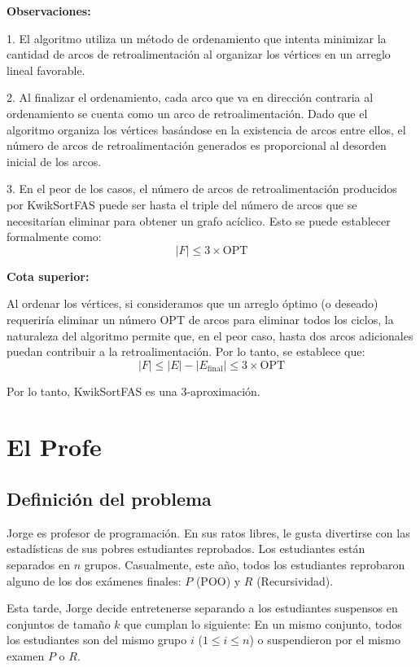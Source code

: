 \documentclass{article}
\begin{document}
\textbf{Observaciones:}

1. El algoritmo utiliza un método de ordenamiento que intenta minimizar la cantidad de arcos de retroalimentación al organizar los vértices en un arreglo lineal favorable.
  
2. Al finalizar el ordenamiento, cada arco que va en dirección contraria al ordenamiento se cuenta como un arco de retroalimentación. Dado que el algoritmo organiza los vértices basándose en la existencia de arcos entre ellos, el número de arcos de retroalimentación generados es proporcional al desorden inicial de los arcos.

3. En el peor de los casos, el número de arcos de retroalimentación producidos por KwikSortFAS puede ser hasta el triple del número de arcos que se necesitarían eliminar para obtener un grafo acíclico. Esto se puede establecer formalmente como:
   \[
   |F| \leq 3 \times \text{OPT}
   \]

\textbf{Cota superior:}

Al ordenar los vértices, si consideramos que un arreglo óptimo (o deseado) requeriría eliminar un número \(\text{OPT}\) de arcos para eliminar todos los ciclos, la naturaleza del algoritmo permite que, en el peor caso, hasta dos arcos adicionales puedan contribuir a la retroalimentación. Por lo tanto, se establece que:
\[
|F| \leq |E| - |E_{\text{final}}| \leq 3 \times \text{OPT}
\]

Por lo tanto, KwikSortFAS es una 3-aproximación.



\section{El Profe}
\subsection{Definición del problema}
Jorge es profesor de programación. En sus ratos libres, le gusta divertirse con las estadísticas de sus pobres estudiantes reprobados. Los estudiantes están separados en $n$ grupos. Casualmente, este año, todos los estudiantes reprobaron alguno de los dos exámenes finales: $P$ (POO) y $R$ (Recursividad).

Esta tarde, Jorge decide entretenerse separando a los estudiantes suspensos en conjuntos de tamaño $k$ que cumplan lo siguiente: En un mismo conjunto, todos los estudiantes son del mismo grupo $i$ ($1 \leq i \leq n$) o suspendieron por el mismo examen $P$ o $R$.
\end{document}

